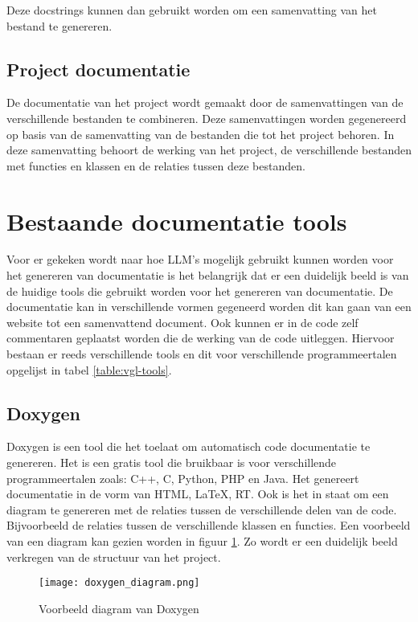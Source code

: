 Deze docstrings kunnen dan gebruikt worden om een samenvatting van het bestand te genereren.

\subsection{Project documentatie}
\label{sec:project-documentatie}
De documentatie van het project wordt gemaakt door de samenvattingen van de verschillende bestanden te combineren.
Deze samenvattingen worden gegenereerd op basis van de samenvatting van de bestanden die tot het project behoren.
In deze samenvatting behoort de werking van het project, de verschillende bestanden met functies en klassen en de relaties tussen deze bestanden.


\section{Bestaande documentatie tools}
\label{sec:huidige-tools}
Voor er gekeken wordt naar hoe LLM's mogelijk gebruikt kunnen worden voor het genereren van documentatie is het belangrijk dat er een duidelijk beeld is van de huidige tools die gebruikt worden voor het genereren van documentatie.
De documentatie kan in verschillende vormen gegeneerd worden dit kan gaan van een website tot een samenvattend document.
Ook kunnen er in de code zelf commentaren geplaatst worden die de werking van de code uitleggen.
Hiervoor bestaan er reeds verschillende tools en dit voor verschillende programmeertalen opgelijst in tabel \ref{table:vgl-tools}.

\subsection{Doxygen}
Doxygen \autocite{Doxygen2023} is een tool die het toelaat om automatisch code documentatie te genereren. Het is een gratis tool die bruikbaar is voor verschillende programmeertalen zoals: C++, C, Python, PHP en Java.
Het genereert documentatie in de vorm van HTML, LaTeX, RT. Ook is het in staat om een diagram te genereren met de relaties tussen de verschillende delen van de code. 
Bijvoorbeeld de relaties tussen de verschillende klassen en functies.
Een voorbeeld van een diagram kan gezien worden in figuur \ref{fig:Doxygen-diagram}.
Zo wordt er een duidelijk beeld verkregen van de structuur van het project.

\begin{figure}[h]
  \centering
  \texttt{[image: doxygen\_diagram.png]}
  \caption{Voorbeeld diagram van Doxygen \autocite{Doxygen2023}}
  \label{fig:Doxygen-diagram}
\end{figure}

